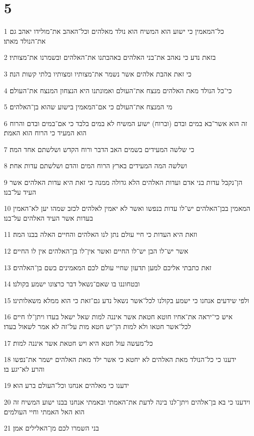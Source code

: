 \chapter{5}

\par 1 כל־המאמין כי ישוע הוא המשיח הוא נולד מאלהים וכל־האהב את־מולידו יאהב גם את־הנולד מאתו׃
\par 2 בזאת נדע כי נאהב את־בני האלהים באהבתנו את־האלהים ובשמרנו את־מצותיו׃
\par 3 כי זאת אהבת אלהים אשר נשמר את־מצותיו ומצותיו בלתי קשות הנה׃
\par 4 כי־כל הנולד מאת האלהים מנצח את־העולם ואמונתנו היא הנצחון המנצח את־העולם׃
\par 5 מי המנצח את־העולם כי אם־המאמין בישוע שהוא בן־האלהים׃
\par 6 זה הוא אשר־בא במים ובדם (וברוח) ישוע המשיח לא במים בלבד כי אם־במים ובדם והרוח הוא המעיד כי הרוח הוא האמת׃
\par 7 כי שלשה המעידים בשמים האב הדבר ורוח הקדש ושלשתם אחד המה׃
\par 8 ושלשה המה המעידים בארץ הרוח המים והדם ושלשתם עדות אחת׃
\par 9 הן־נקבל עדות בני אדם ועדות האלהים הלא גדולה ממנה כי זאת היא עדות האלהים אשר העיד על־בנו׃
\par 10 המאמין בבן־האלהים יש־לו עדות בנפשו ואשר לא יאמין לאלהים לכזב שמהו יען לא־האמין בעדות אשר העיד האלהים על־בנו׃
\par 11 וזאת היא העדות כי חיי עולם נתן לנו האלהים והחיים האלה בבנו המה׃
\par 12 אשר יש־לו הבן יש־לו החיים ואשר אין־לו בן־האלהים אין לו החיים׃
\par 13 זאת כתבתי אליכם למען תדעון שחיי עולם לכם המאמינים בשם בן־האלהים׃
\par 14 ובטחוננו בו שאם־נשאל דבר כרצונו ישמע בקולנו׃
\par 15 ולפי שידעים אנחנו כי ישמע בקולנו לכל־אשר נשאל נדע גם־זאת כי הוא ממלא משאלותינו׃
\par 16 איש כי־יראה את־אחיו חוטא חטאת אשר איננה למות שאל ישאל בעדו ויתן־לו חיים לכל־אשר חטאו ולא למות הן־יש חטא מות על־זה לא אמר לשאול בעדו׃
\par 17 כל־מעשה עול חטא היא ויש חטאת אשר איננה למות׃
\par 18 ידענו כי כל־הנולד מאת האלהים לא יחטא כי אשר ילד מאת האלהים ישמר את־נפשו והרע לא־יגע בו׃
\par 19 ידענו כי מאלהים אנחנו וכל־העולם ברע הוא׃
\par 20 וידענו כי בא בן־אלהים ויתן־לנו בינה לדעת את־האמתי ובאמתי אנחנו בבנו ישוע המשיח זה הוא האל האמתי וחיי העולמים׃
\par 21 בני השמרו לכם מן־האלילים אמן׃


